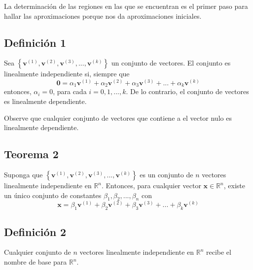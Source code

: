\documentclass{report}
\numberwithin{subsection}{section} %
\begin{document}
La determinación de las regiones en las que se encuentran es el primer paso para hallar las aproximaciones porque nos da aproximaciones iniciales.

\subsection{\textnormal{Definición 1}}

Sea $\left\{ \textbf{v}^{\left( 1 \right)}, \textbf{v}^{\left( 2 \right)}, \textbf{v}^{\left( 3 \right)}, ..., \textbf{v}^{\left( k \right)} \right\}$ un conjunto de vectores. El conjunto es linealmente independiente si, siempre que
\begin{equation}
\textbf{0} = \alpha_{1}\textbf{v}^{\left( 1 \right)} + \alpha_{2}\textbf{v}^{\left( 2 \right)} + \alpha_{3}\textbf{v}^{\left( 3 \right)} + ... + \alpha_{k}\textbf{v}^{\left( k \right)}
\end{equation}
entonces, $\alpha_{i}=0$, para cada $i = 0, 1, ..., k$. De lo contrario, el conjunto de vectores es linealmente dependiente.

Observe que cualquier conjunto de vectores que contiene a el vector nulo es linealmente dependiente.

\subsection{\textnormal{Teorema 2}}

Suponga que $\left\{ \textbf{v}^{\left( 1 \right)}, \textbf{v}^{\left( 2 \right)}, \textbf{v}^{\left( 3 \right)}, ..., \textbf{v}^{\left( k \right)} \right\}$ es un conjunto de $n$ vectores linealmente independiente en $\mathbb{R}^{n}$. Entonces, para cualquier vector $\textbf{x} \in \mathbb{R}^{n}$, existe un único conjunto de constantes $\beta_{1}, \beta_{2}, ..., \beta_{n}$ con
\begin{equation}
\textbf{x} = \beta_{1}\textbf{v}^{\left( 1 \right)} + \beta_{2}\textbf{v}^{\left( 2 \right)} + \beta_{3}\textbf{v}^{\left( 3 \right)} + ... + \beta_{k}\textbf{v}^{\left( k \right)}
\end{equation}

\subsection{\textnormal{Definición 2}}

Cualquier conjunto de $n$ vectores linealmente independiente en $\mathbb{R}^{n}$ recibe el nombre de base para $\mathbb{R}^{n}$.
\end{document}
